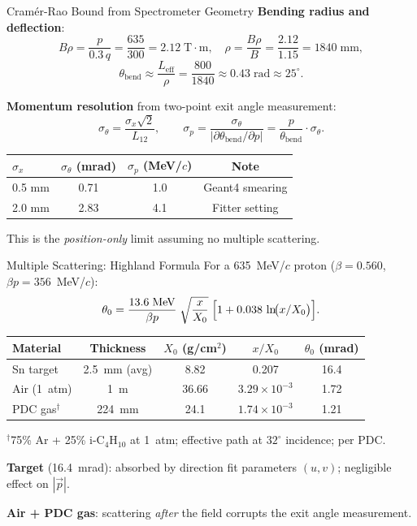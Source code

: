\documentclass[aspectratio=169]{beamer}
\begin{document}
\begin{frame}{Cram\'{e}r-Rao Bound from Spectrometer Geometry}
\small
\textbf{Bending radius and deflection}:
\[
B\rho = \frac{p}{0.3\,q} = \frac{635}{300} = 2.12\;\mathrm{T{\cdot}m}, \quad
\rho = \frac{B\rho}{B} = \frac{2.12}{1.15} = 1840\;\mathrm{mm},
\]
\[
\theta_\mathrm{bend} \approx \frac{L_\mathrm{eff}}{\rho} = \frac{800}{1840} \approx 0.43\;\mathrm{rad} \approx 25^\circ.
\]

\textbf{Momentum resolution} from two-point exit angle measurement:
\[
\sigma_\theta = \frac{\sigma_x \sqrt{2}}{L_{12}}, \qquad
\sigma_p = \frac{\sigma_\theta}{\bigl|\partial\theta_\mathrm{bend}/\partial p\bigr|}
= \frac{p}{\theta_\mathrm{bend}} \cdot \sigma_\theta.
\]

\begin{table}
\centering
\begin{tabular}{lccc}
\toprule
$\sigma_x$ & $\sigma_\theta$ (mrad) & $\sigma_p$ (MeV/$c$) & Note \\
\midrule
0.5 mm & 0.71 & 1.0 & Geant4 smearing \\
2.0 mm & 2.83 & 4.1 & Fitter setting \\
\bottomrule
\end{tabular}
\end{table}

This is the \emph{position-only} limit assuming no multiple scattering.
\end{frame}

\begin{frame}{Multiple Scattering: Highland Formula}
\small
For a 635~MeV/$c$ proton ($\beta = 0.560$, $\beta p = 356$~MeV/$c$):
\[
\theta_0 = \frac{13.6\;\mathrm{MeV}}{\beta p}\;\sqrt{\frac{x}{X_0}}\;
\Bigl[1 + 0.038\,\ln\!\bigl(x/X_0\bigr)\Bigr].
\]

\begin{table}
\centering
\begin{tabular}{lcccc}
\toprule
Material & Thickness & $X_0$ (g/cm$^2$) & $x/X_0$ & $\theta_0$ (mrad) \\
\midrule
Sn target & 2.5~mm (avg) & 8.82 & 0.207 & 16.4 \\
Air (1~atm) & 1~m & 36.66 & $3.29{\times}10^{-3}$ & 1.72 \\
PDC gas$^\dagger$ & 224~mm & 24.1 & $1.74{\times}10^{-3}$ & 1.21 \\
\bottomrule
\end{tabular}
\end{table}
{\footnotesize $^\dagger$75\% Ar + 25\% i-C$_4$H$_{10}$ at 1~atm; effective path at $32^\circ$ incidence; per PDC.}

\vspace{0.15cm}
\textbf{Target} (16.4~mrad): absorbed by direction fit parameters $(u,v)$; negligible effect on $|\vec{p}|$.

\textbf{Air + PDC gas}: scattering \emph{after} the field corrupts the exit angle measurement.
\end{frame}
\end{document}
